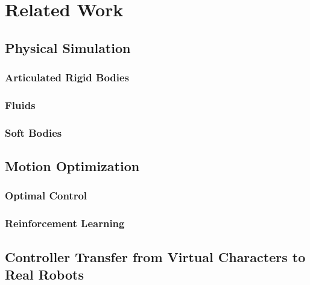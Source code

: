 \chapter{Related Work}

\section{Physical Simulation}
\subsection{Articulated Rigid Bodies}
\subsection{Fluids}
\subsection{Soft Bodies}

\section{Motion Optimization}
\subsection{Optimal Control}
\subsection{Reinforcement Learning}

\section{Controller Transfer from Virtual Characters to Real Robots}
